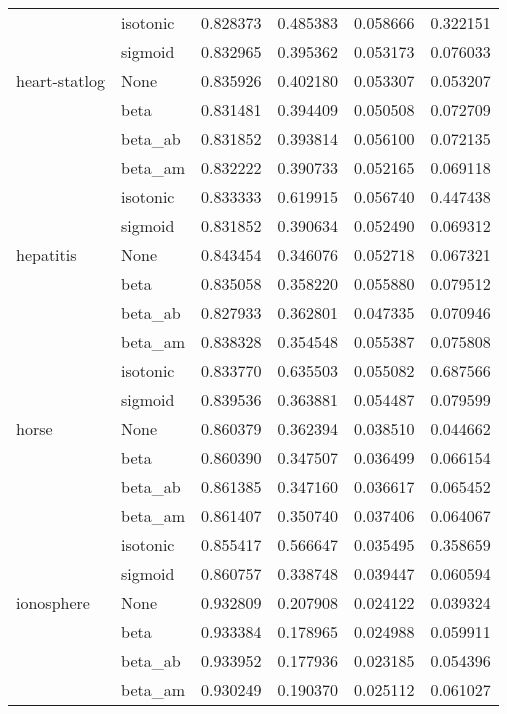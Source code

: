 \begin{tabular}{llrrrr}
        & isotonic &  0.828373 &  0.485383 &  0.058666 &  0.322151 \\
        & sigmoid &  0.832965 &  0.395362 &  0.053173 &  0.076033 \\
heart-statlog & None &  0.835926 &  0.402180 &  0.053307 &  0.053207 \\
        & beta &  0.831481 &  0.394409 &  0.050508 &  0.072709 \\
        & beta\_ab &  0.831852 &  0.393814 &  0.056100 &  0.072135 \\
        & beta\_am &  0.832222 &  0.390733 &  0.052165 &  0.069118 \\
        & isotonic &  0.833333 &  0.619915 &  0.056740 &  0.447438 \\
        & sigmoid &  0.831852 &  0.390634 &  0.052490 &  0.069312 \\
hepatitis & None &  0.843454 &  0.346076 &  0.052718 &  0.067321 \\
        & beta &  0.835058 &  0.358220 &  0.055880 &  0.079512 \\
        & beta\_ab &  0.827933 &  0.362801 &  0.047335 &  0.070946 \\
        & beta\_am &  0.838328 &  0.354548 &  0.055387 &  0.075808 \\
        & isotonic &  0.833770 &  0.635503 &  0.055082 &  0.687566 \\
        & sigmoid &  0.839536 &  0.363881 &  0.054487 &  0.079599 \\
horse & None &  0.860379 &  0.362394 &  0.038510 &  0.044662 \\
        & beta &  0.860390 &  0.347507 &  0.036499 &  0.066154 \\
        & beta\_ab &  0.861385 &  0.347160 &  0.036617 &  0.065452 \\
        & beta\_am &  0.861407 &  0.350740 &  0.037406 &  0.064067 \\
        & isotonic &  0.855417 &  0.566647 &  0.035495 &  0.358659 \\
        & sigmoid &  0.860757 &  0.338748 &  0.039447 &  0.060594 \\
ionosphere & None &  0.932809 &  0.207908 &  0.024122 &  0.039324 \\
        & beta &  0.933384 &  0.178965 &  0.024988 &  0.059911 \\
        & beta\_ab &  0.933952 &  0.177936 &  0.023185 &  0.054396 \\
        & beta\_am &  0.930249 &  0.190370 &  0.025112 &  0.061027 \\

\end{tabular}
